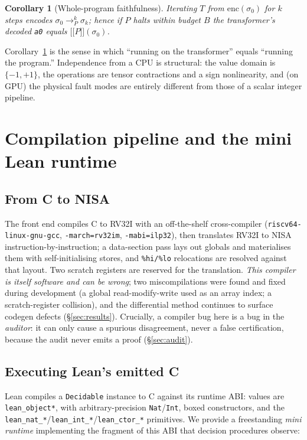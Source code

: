\documentclass[11pt]{article}
\theoremstyle{definition}
\theoremstyle{plain}
\newtheorem{corollary}{Corollary}
\theoremstyle{remark}
\newcommand{\step}{\longrightarrow}
\newcommand{\bp}{\{-1,+1\}}
\providecommand{\llbracket}{\mathopen{[\![}}
\providecommand{\rrbracket}{\mathclose{]\!]}}
\newcommand{\sem}[1]{\llbracket #1 \rrbracket}
\begin{document}
\begin{corollary}[Whole-program faithfulness]\label{cor:whole}
Iterating $T$ from $\mathrm{enc}(\sigma_0)$ for $k$ steps encodes $\sigma_0 \step_P^{k} \sigma_k$;
hence if $P$ halts within budget $B$ the transformer's decoded \texttt{a0} equals $\sem{P}(\sigma_0)$.
\end{corollary}

Corollary~\ref{cor:whole} is the sense in which ``running on the transformer'' equals ``running the
program.'' Independence from a CPU is structural: the value domain is $\bp$, the operations are tensor
contractions and a sign nonlinearity, and (on GPU) the physical fault modes are entirely different from
those of a scalar integer pipeline.

\section{Compilation pipeline and the mini Lean runtime}\label{sec:pipeline}

\subsection{From C to NISA}
The front end compiles C to RV32I with an off-the-shelf cross-compiler
(\texttt{riscv64-linux-gnu-gcc}, \texttt{-march=rv32im}, \texttt{-mabi=ilp32}), then translates RV32I to
NISA instruction-by-instruction; a data-section pass lays out globals and materialises them with
self-initialising stores, and \texttt{\%hi/\%lo} relocations are resolved against that layout. Two
scratch registers are reserved for the translation. \emph{This compiler is itself software and can be
wrong}; two miscompilations were found and fixed during development (a global read-modify-write used as
an array index; a scratch-register collision), and the differential method continues to surface codegen
defects (\S\ref{sec:results}). Crucially, a compiler bug here is a bug in the \emph{auditor}: it can
only cause a spurious disagreement, never a false certification, because the audit never emits a proof
(\S\ref{sec:audit}).

\subsection{Executing Lean's emitted C}
Lean compiles a \texttt{Decidable} instance to C against its runtime ABI: values are
\texttt{lean\_object*}, with arbitrary-precision \texttt{Nat}/\texttt{Int}, boxed constructors, and the
\texttt{lean\_nat\_*}/\texttt{lean\_int\_*}/\texttt{lean\_ctor\_*} primitives. We provide a freestanding
\emph{mini runtime} implementing the fragment of this ABI that decision procedures observe:
\end{document}
